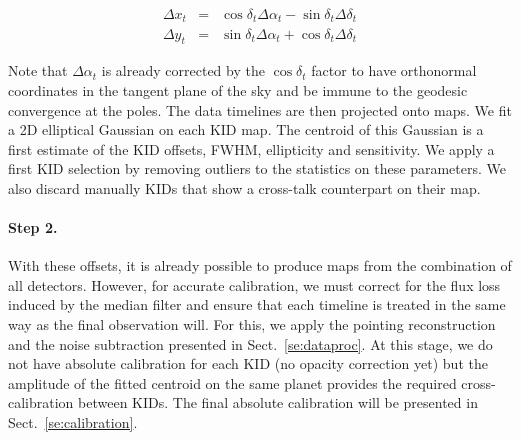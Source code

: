 \begin{eqnarray}
\Delta x_t &=& \cos\delta_t \Delta\alpha_t - \sin \delta_t\Delta \delta_t \nonumber \\
\Delta y_t &=& \sin\delta_t \Delta\alpha_t + \cos \delta_t\Delta \delta_t \nonumber
\end{eqnarray}

Note that $\Delta\alpha_t$ is already corrected by the $\cos\delta_t$ factor to
have orthonormal coordinates in the tangent plane of the sky and be immune to
the geodesic convergence at the poles.
The data timelines are then projected onto maps. 
We fit a 2D elliptical Gaussian on
each KID map. The centroid of this Gaussian is a first estimate of the KID
offsets, FWHM, ellipticity and sensitivity. We apply a first KID selection by
removing outliers to the statistics on these parameters. We also discard
manually KIDs that show a cross-talk counterpart on their map.

\paragraph{Step 2.} With these offsets, it is already possible to
produce maps from the combination of all detectors. However, for
accurate calibration, we must correct for the flux loss
induced by the median filter and ensure that each timeline is treated
in the same way as the final observation will. For this, we apply the
pointing reconstruction and the noise subtraction presented in
Sect.~\ref{se:dataproc}.
At this stage, we do not have
absolute calibration for each KID (no opacity correction yet) but the
amplitude of the fitted centroid on the same planet provides the required
cross-calibration between KIDs. The final absolute calibration will be
presented in Sect.~\ref{se:calibration}.\\

